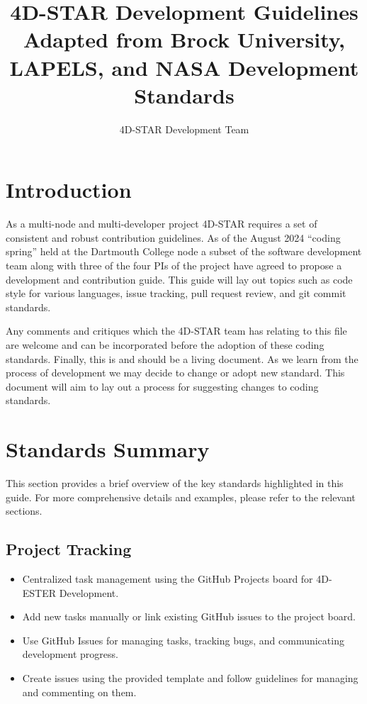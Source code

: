 \documentclass{ol-softwaremanual}
\title{4D-STAR Development Guidelines\\\small{Adapted from Brock University, LAPELS, and NASA Development Standards}}
\author{4D-STAR Development Team}
\begin{document}
\maketitle

\tableofcontents
\newpage

\section{Introduction}

As a multi-node and multi-developer project 4D-STAR requires a set of consistent
and robust contribution guidelines. As of the August 2024 ``coding spring'' held
at the Dartmouth College node a subset of the software development team along
with three of the four PIs of the project have agreed to propose a development
and contribution guide. This guide will lay out topics such as code style for
various languages, issue tracking, pull request review, and git commit
standards.

Any comments and critiques which the 4D-STAR team has relating to this file are
welcome and can be incorporated before the adoption of these coding standards.
Finally, this is and should be a living document. As we learn from the process
of development we may decide to change or adopt new standard. This document will
aim to lay out a process for suggesting changes to coding standards.

\section{Standards Summary}

This section provides a brief overview of the key standards highlighted in this
guide. For more comprehensive details and examples, please refer to the
relevant sections.

\subsection{Project Tracking}
\begin{itemize}
\item Centralized task management using the GitHub Projects board for 4D-ESTER Development.
\item Add new tasks manually or link existing GitHub issues to the project board.
\item Use GitHub Issues for managing tasks, tracking bugs, and communicating development progress.
\item Create issues using the provided template and follow guidelines for managing and commenting on them.
\end{itemize}
\end{document}
